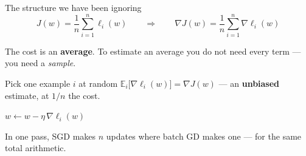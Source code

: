 \documentclass[aspectratio=169]{beamer}
\begin{document}
\begin{frame}[shrink=9]{The structure we have been ignoring}
  \[
    J(w) = \frac{1}{n}\sum_{i=1}^{n} \ell_i(w)
    \qquad\Longrightarrow\qquad
    \nabla J(w) = \frac{1}{n}\sum_{i=1}^{n} \nabla \ell_i(w)
  \]
  \vspace{0.1em}
  \begin{center}
    The cost is an \textbf{average}. To estimate an average you do not need
    every term --- you need a \emph{sample}.
  \end{center}
  \vspace{0.5em}
  \begin{exampleblock}{Pick one example $i$ at random}
    \centering
    $\mathbb{E}_i\big[\nabla \ell_i(w)\big] = \nabla J(w)$ \quad --- an
    \textbf{unbiased} estimate, at $1/n$ the cost.
  \end{exampleblock}
  \vspace{0.4em}
  \begin{center}\Large
    $w \leftarrow w - \eta\,\nabla \ell_i(w)$
  \end{center}
  \begin{center}\small
    In one pass, SGD makes $n$ updates where batch GD makes one --- for the
    same total arithmetic.
  \end{center}
\end{frame}
\end{document}
